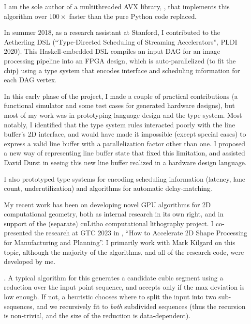 I am the sole author of a multithreaded AVX
library, ,
that implements this algorithm over $100\times$ faster than the pure
Python code replaced.

In summer 2018, as a research assistant at Stanford, I contributed to
the Aetherling DSL (``Type-Directed Scheduling of Streaming
Accelerators'', PLDI 2020). This Haskell-embedded DSL compiles an
input DAG for an image processing pipeline into an FPGA design, which
is auto-parallelized (to fit the chip) using a type system that
encodes interface and scheduling information for each DAG vertex.

In this early phase of the project, I made a couple of practical
contributions (a functional simulator and some test cases for
generated hardware designs), but most of my work was in prototyping
language design and the type system.  Most notably, I identified that
the type system rules interacted poorly with the line buffer's 2D
interface, and would have made it impossible (except special cases) to
express a valid line buffer with a parallelization factor other than
one. I proposed a new way of representing line buffer state that fixed
this limitation, and assisted David Durst in seeing this new line
buffer realized in a hardware design language.

I also prototyped type systems for encoding scheduling information
(latency, lane count, underutilization) and algorithms for automatic
delay-matching.

\filbreak

My recent work has been on developing novel GPU algorithms for 2D
computational geometry, both as internal research in its own right,
and in support of the (separate) cuLitho computational lithography
project. I co-presented the research at GTC 2023
in , ``How to Accelerate 2D Shape Processing for Manufacturing and
Planning''. I primarily work with Mark Kilgard on this topic, although
the majority of the algorithms, and all of the research code, were
developed by me.

. A typical algorithm for this generates a candidate
cubic segment using a reduction over the input point sequence, and
accepts only if the max deviation is low enough. If not, a heuristic
chooses where to split the input into two sub-sequences, and we
recursively fit to \textit{both} subdivided sequences (thus the
recursion is non-trivial, and the size of the reduction is
data-dependent).

